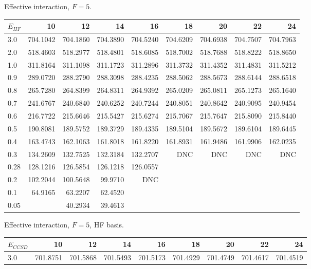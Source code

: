 \begin{landscape}
\begin{table}
\begin{center}
Effective interaction, $F=5$.\\
\begin{tabular}{l|rrrrrrrr}
\hline 
$E_{HF}$ & 10 & 12 & 14 & 16 & 18 & 20 & 22 & 24 \\
\hline \hline
3.0 & 704.1042 & 704.1860 & 704.3890 & 704.5240 & 704.6209 & 704.6938 & 704.7507 & 704.7963 \\ 
2.0 & 518.4603 & 518.2977 & 518.4801 & 518.6085 & 518.7002 & 518.7688 & 518.8222 & 518.8650 \\ 
1.0 & 311.8164 & 311.1098 & 311.1723 & 311.2896 & 311.3732 & 311.4352 & 311.4831 & 311.5212 \\ 
0.9 & 289.0720 & 288.2790 & 288.3098 & 288.4235 & 288.5062 & 288.5673 & 288.6144 & 288.6518 \\ 
0.8 & 265.7280 & 264.8399 & 264.8311 & 264.9392 & 265.0209 & 265.0811 & 265.1273 & 265.1640 \\ 
0.7 & 241.6767 & 240.6840 & 240.6252 & 240.7244 & 240.8051 & 240.8642 & 240.9095 & 240.9454 \\ 
0.6 & 216.7722 & 215.6646 & 215.5427 & 215.6274 & 215.7067 & 215.7647 & 215.8090 & 215.8440 \\ 
0.5 & 190.8081 & 189.5752 & 189.3729 & 189.4335 & 189.5104 & 189.5672 & 189.6104 & 189.6445 \\ 
0.4 & 163.4743 & 162.1063 & 161.8018 & 161.8220 & 161.8931 & 161.9486 & 161.9906 & 162.0235 \\ 
0.3 & 134.2609 & 132.7525 & 132.3184 & 132.2707 & DNC      &      DNC &      DNC &      DNC \\ 
0.28 & 128.1216 & 126.5854 & 126.1218 & 126.0557  \\ 
0.2 & 102.2044 & 100.5648 & 99.9710 & DNC  \\ 
0.1 & 64.9165 & 63.2207 & 62.4520  \\ 
0.05 &         & 40.2934 & 39.4613  \\ 
\hline \hline
\end{tabular}
\end{center}
\begin{center}
Effective interaction, $F=5$, HF basis.\\
\begin{tabular}{l|rrrrrrrr}
\hline 
$E_{CCSD}$ & 10 & 12 & 14 & 16 & 18 & 20 & 22 & 24 \\
\hline \hline
3.0 & 701.8751 & 701.5868 & 701.5493 & 701.5173 & 701.4929 & 701.4749 & 701.4617 & 701.4519 \\ 

\end{tabular}
\end{center}
\end{table}
\end{landscape}
